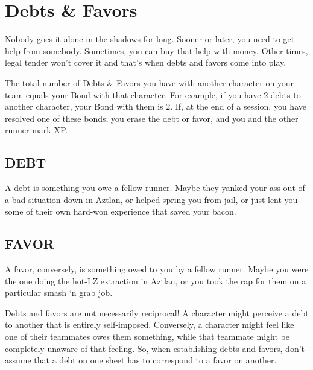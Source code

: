 \section{Debts \& Favors}

Nobody goes it alone in the shadows for long. Sooner or later, you need to get help from somebody. Sometimes, you can buy that help with money. Other times, legal tender won’t cover it and that’s when debts and favors come into play.

The total number of Debts \& Favors you have with another character on your team equals your Bond with that character. For example, if you have 2 debts to another character, your Bond with them is 2. If, at the end of a session, you have resolved one of these bonds, you erase the debt or favor, and you and the other runner mark XP.

\subsection{DEBT}
A debt is something you owe a fellow runner. Maybe they yanked your ass out of a bad situation down in Aztlan, or helped spring you from jail, or just lent you some of their own hard-won experience that saved your bacon.

\subsection{FAVOR}
A favor, conversely, is something owed to you by a fellow runner. Maybe you were the one doing the hot-LZ extraction in Aztlan, or you took the rap for them on a particular smash ‘n grab job.

Debts and favors are not necessarily reciprocal! A character might perceive a debt to another that is entirely self-imposed. Conversely, a character might feel like one of their teammates owes them something, while that teammate might be completely unaware of that feeling. So, when establishing debts and favors, don’t assume that a debt on one sheet has to correspond to a favor on another.
